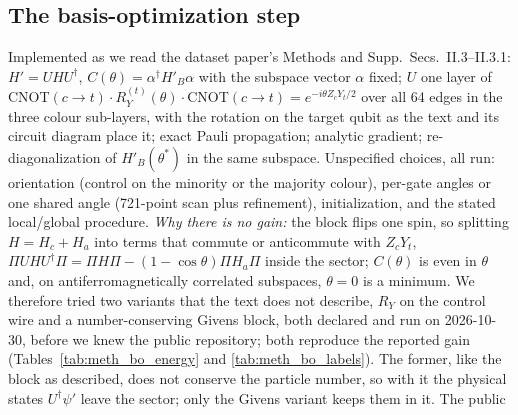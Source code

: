 \documentclass[aps,prx,onecolumn,10pt,nofootinbib,longbibliography,floatfix]{revtex4-2}
\theoremstyle{remark}
\begin{document}
\subsection{The basis-optimization step}
\label{sm:bo}
Implemented as we read the dataset paper's Methods and Supp.\ Secs.~II.3--II.3.1: $H'=UHU^\dagger$, %
$C(\theta)=\alpha^\dagger H'_B\alpha$ with the subspace vector $\alpha$ fixed; $U$ one layer of
CNOT$(c\to t)\cdot R_Y^{(t)}(\theta)\cdot$CNOT$(c\to t)=e^{-i\theta Z_cY_t/2}$ over all 64 edges in the three colour %
sub-layers, with the rotation on the target qubit as the text and its circuit diagram place it; exact Pauli
propagation; analytic gradient; re-diagonalization of $H'_B(\theta^*)$ in the same subspace.
Unspecified choices, all run: orientation (control on the minority or the majority colour), per-gate angles or one
shared angle (721-point scan plus refinement), initialization, and the stated local/global procedure. \emph{Why there is %
no gain:} the block flips one spin, so splitting $H=H_c+H_a$ into terms that commute or anticommute with $Z_cY_t$,
$\Pi UHU^\dagger\Pi=\Pi H\Pi-(1-\cos\theta)\Pi H_a\Pi$ inside the sector; $C(\theta)$ is even in $\theta$ and, on %
antiferromagnetically correlated subspaces, $\theta=0$ is a minimum. We therefore tried two variants that the text does not describe, $R_Y$ %
on the control wire and a number-conserving Givens block, both declared and run on 2026-10-30, before we knew the %
public repository; both reproduce the reported gain (Tables~\ref{tab:meth_bo_energy} and \ref{tab:meth_bo_labels}).
The former, like the block as described, does not conserve the particle number, so with it the physical states
$U^\dagger\psi'$ leave the sector; only the Givens variant keeps them in it. The public
\end{document}
